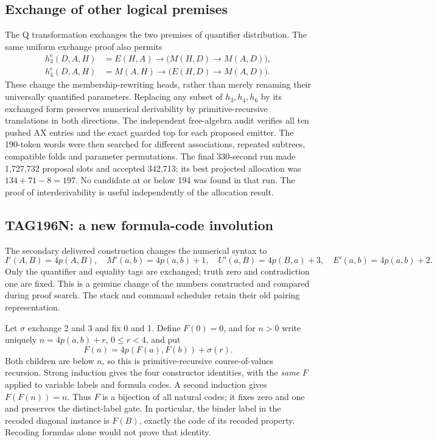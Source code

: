 \subsection{Exchange of other logical premises}

The Q transformation exchanges the two premises of quantifier distribution.
The same uniform exchange proof also permits
\begin{align*}
 h_3^{\mathrm e}(D,A,H)
  &=E(H,A)\to\bigl(M(H,D)\to M(A,D)\bigr),\\
 h_4^{\mathrm e}(D,A,H)
  &=M(A,H)\to\bigl(E(H,D)\to M(A,D)\bigr).
\end{align*}
These change the membership-rewriting heads, rather than merely renaming
their universally quantified parameters. Replacing any subset of
$h_3,h_4,h_6$ by its exchanged form preserves numerical derivability by
primitive-recursive translations in both directions. The independent
free-algebra audit verifies all ten pushed AX entries and the exact guarded
top for each proposed emitter. The 190-token words were then searched for
different associations, repeated subtrees, compatible folds and parameter
permutations. The final 330-second run made 1,727,732 proposal slots and accepted
342,713; its best projected allocation was $134+71-8=197$. No candidate
at or below 194 was found in that run. The proof of
interderivability is useful independently of the allocation result.

\subsection{TAG196N: a new formula-code involution}

The secondary delivered construction changes the numerical syntax to
\[
 I'(A,B)=4p(A,B),\quad M'(a,b)=4p(a,b)+1,\quad
 U'(a,B)=4p(B,a)+3,\quad E'(a,b)=4p(a,b)+2.
\]
Only the quantifier and equality tags are exchanged; truth zero and
contradiction one are fixed. This is a genuine change of the numbers
constructed and compared during proof search. The stack and command
scheduler retain their old pairing representation.

Let $\sigma$ exchange 2 and 3 and fix 0 and 1. Define $F(0)=0$, and for
$n>0$ write uniquely $n=4p(a,b)+r$, $0\le r<4$, and put
\[
 F(n)=4p(F(a),F(b))+\sigma(r).
\]
Both children are below $n$, so this is primitive-recursive
course-of-values recursion. Strong induction gives the four constructor
identities, with the \emph{same} $F$ applied to variable labels and formula
codes. A second induction gives $F(F(n))=n$. Thus $F$ is a bijection of all
natural codes; it fixes zero and one and preserves the distinct-label gate.
In particular, the binder label in the recoded diagonal instance is
$F(B)$, exactly the code of its recoded property. Recoding formulas alone
would not prove that identity.

